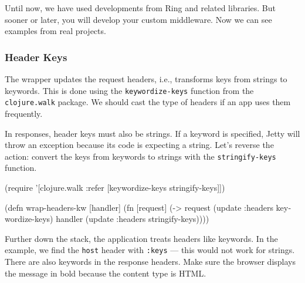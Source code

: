 
Until now, we have used developments from Ring and related libraries. But sooner or later, you will develop your custom middleware. Now we can see examples from real projects.

\subsubsection*{Header Keys}


The wrapper updates the request headers, i.e., transforms keys from strings to keywords. This is done using the \verb|keywordize-keys| function from the \verb|clojure.walk| package. We should cast the type of headers if an app uses them frequently.


In responses, header keys must also be strings. If a keyword is specified, Jetty will throw an exception because its code is expecting a string. Let's reverse the action: convert the keys from keywords to strings with the \verb|stringify-keys| function.


\begin{english}
\begin{clojure}
(require '[clojure.walk :refer
[keywordize-keys stringify-keys]])

(defn wrap-headers-kw [handler]
(fn [request]
(-> request
(update :headers keywordize-keys)
handler
(update :headers stringify-keys))))
\end{clojure}
\end{english}

Further down the stack, the application treats headers like keywords. In the example, we find the \verb|host| header with \verb|:keys| — this would not work for strings. There are also keywords in the response headers. Make sure the browser displays the message in bold because the content type is HTML.

\begin{english}
\end{english}

